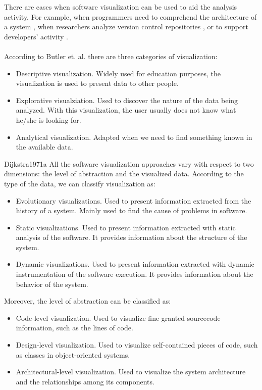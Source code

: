 There are cases when software visualization can be used to aid the analysis activity. For example, when programmers need to comprehend the architecture of a system \cite{Panas2007}, when researchers analyze version control repositories \cite{Greene2017}, or to support developers' activity \cite{LopezHerrejon2018}. \\
\\
According to Butler et. al. \cite{Butler1993} there are three categories of visualization:
\begin{itemize}
	 \item Descriptive visualization. Widely used for education purposes, the visualization is used to present data to other people. 
	 \item Explorative visualziation. Used to discover the nature of the data being analyzed. With this visualization, the user usually does not know what he/she is looking for. 
	 \item Analytical visualization. Adapted when we need to find something known in the available data. 
\end{itemize}
	Dijkstra1971a
All the software visualization approaches vary with respect to two dimensions: the level of abstraction and the visualized data.
According to the type of the data, we can classify visualization as:
\begin{itemize}
	\item Evolutionary visualizations. Used to present information extracted from the history of a system. Mainly used to find the cause of problems in software. 
	\item Static visualizations. Used to present information extracted with static analysis of the software. It provides information about the structure of the system.
	\item Dynamic visualizations. Used to present information extracted with dynamic instrumentation of the software execution. It provides information about the behavior of the system.
\end{itemize}

Moreover, the level of abstraction can be classified as:
\begin{itemize}
	\item Code-level visualization. Used to visualize fine granted sourcecode information, such as the lines of code. 
	\item Design-level visualization. Used to visualize self-contained pieces of code, such as classes in object-oriented systems. 
	\item Architectural-level visualization. Used to visualize the system architecture and the relationships among its components. 
\end{itemize}


